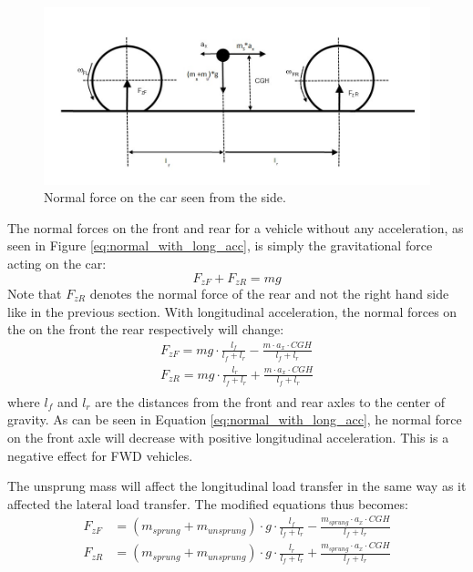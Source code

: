 \begin{figure}[h]
	\centering
	\includegraphics[width=1\textwidth]{Pictures/normal_force_longitudinal}
	\caption{Normal force on the car seen from the side.}
	\label{normal_force_longitudinal}
\end{figure}
The normal forces on the front and rear for a vehicle without any acceleration, as seen in Figure \ref{eq:normal_with_long_acc}, is simply the gravitational force acting on the car:
\begin{equation} \label{eq:normal_2}
	F_{zF} + F_{zR} = mg
\end{equation}
Note that $ F_{zR} $ denotes the normal force of the rear and not the right hand side like in the previous section. With longitudinal acceleration, the normal forces on the on the front the rear respectively will change:
\begin{equation} \label{eq:normal_with_long_acc}
\begin{split}
	F_{zF} = mg\cdot \frac{l_{f}}{l_{f}+l_{r}} - \frac{m\cdot a_{x}\cdot CGH}{l_{f}+l_{r}} \\
	F_{zR} = mg\cdot \frac{l_{r}}{l_{f}+l_{r}} + \frac{m\cdot a_{x}\cdot CGH}{l_{f}+l_{r}} \\	
\end{split}
\end{equation}
where $ l_{f} $ and $ l_{r} $ are the distances from the front and rear axles to the center of gravity. As can be seen in Equation \ref{eq:normal_with_long_acc}, he normal force on the front axle will decrease with positive longitudinal acceleration. This is a negative effect for FWD vehicles.

The unsprung mass will affect the longitudinal load transfer in the same way as it affected the lateral load transfer. The modified equations thus becomes: 
\begin{equation} \label{eq:normal_with_long_acc_unsprung}
\begin{split}
F_{zF} &= (m_{sprung}+m_{unsprung})\cdot g\cdot \frac{l_{f}}{l_{f}+l_{r}} - \frac{m_{sprung}\cdot a_{x}\cdot CGH}{l_{f}+l_{r}} \\
F_{zR} &= (m_{sprung}+m_{unsprung})\cdot g\cdot \frac{l_{r}}{l_{f}+l_{r}} + \frac{m_{sprung}\cdot a_{x}\cdot CGH}{l_{f}+l_{r}} \\	
\end{split}
\end{equation}


